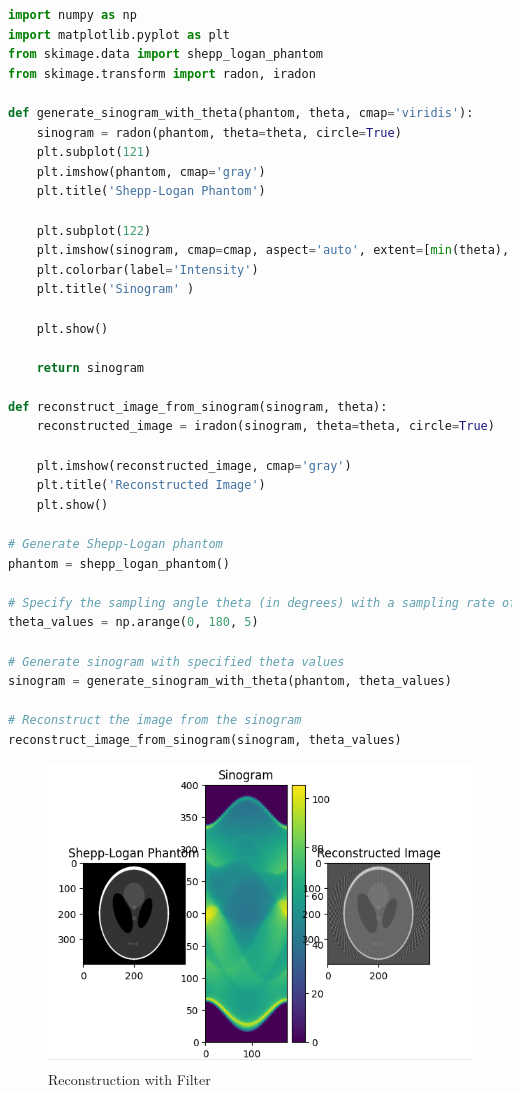 \documentclass{article}
\begin{document}
\begin{lstlisting}[language=Python, style=python, caption={Reconstructing Sinogram using Inverse Radon Transform}]
import numpy as np
import matplotlib.pyplot as plt
from skimage.data import shepp_logan_phantom
from skimage.transform import radon, iradon

def generate_sinogram_with_theta(phantom, theta, cmap='viridis'):
    sinogram = radon(phantom, theta=theta, circle=True)
    plt.subplot(121)
    plt.imshow(phantom, cmap='gray')
    plt.title('Shepp-Logan Phantom')

    plt.subplot(122)
    plt.imshow(sinogram, cmap=cmap, aspect='auto', extent=[min(theta), max(theta), 0, sinogram.shape[0]])
    plt.colorbar(label='Intensity')
    plt.title('Sinogram' )

    plt.show()

    return sinogram

def reconstruct_image_from_sinogram(sinogram, theta):
    reconstructed_image = iradon(sinogram, theta=theta, circle=True)

    plt.imshow(reconstructed_image, cmap='gray')
    plt.title('Reconstructed Image')
    plt.show()

# Generate Shepp-Logan phantom
phantom = shepp_logan_phantom()

# Specify the sampling angle theta (in degrees) with a sampling rate of 0.05 degrees
theta_values = np.arange(0, 180, 5)

# Generate sinogram with specified theta values
sinogram = generate_sinogram_with_theta(phantom, theta_values)

# Reconstruct the image from the sinogram
reconstruct_image_from_sinogram(sinogram, theta_values)

\end{lstlisting}
\begin{figure}
    \centering
    \includegraphics[width=0.625\linewidth]{Reconstruction.png}
    \caption{Reconstruction with Filter}
    \label{fig:enter-label}
\end{figure}
\end{document}
